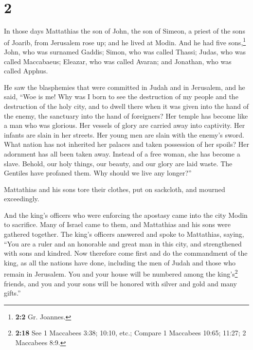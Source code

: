 \hypertarget{section-1}{%
\section{2}\label{section-1}}

 In those days Mattathias the son of John, the son of
Simeon, a priest of the sons of Joarib, from Jerusalem rose up; and he
lived at Modin.  And he had five sons,\footnote{\textbf{2:2}
  Gr. Joannes.} John, who was surnamed Gaddis;  Simon, who
was called Thassi;  Judas, who was called Maccabaeus;
 Eleazar, who was called Avaran; and Jonathan, who was
called Apphus.

 He saw the blasphemies that were committed in Judah and
in Jerusalem,  and he said, ``Woe is me! Why was I born to
see the destruction of my people and the destruction of the holy city,
and to dwell there when it was given into the hand of the enemy, the
sanctuary into the hand of foreigners?  Her temple has
become like a man who was glorious.  Her vessels of glory
are carried away into captivity. Her infants are slain in her streets.
Her young men are slain with the enemy's sword.  What
nation has not inherited her palaces and taken possession of her spoils?
 Her adornment has all been taken away. Instead of a free
woman, she has become a slave.  Behold, our holy things,
our beauty, and our glory are laid waste. The Gentiles have profaned
them.  Why should we live any longer?''

 Mattathias and his sons tore their clothes, put on
sackcloth, and mourned exceedingly.

 And the king's officers who were enforcing the apostasy
came into the city Modin to sacrifice.  Many of Israel
came to them, and Mattathias and his sons were gathered together.
 The king's officers answered and spoke to Mattathias,
saying, ``You are a ruler and an honorable and great man in this city,
and strengthened with sons and kindred.  Now therefore
come first and do the commandment of the king, as all the nations have
done, including the men of Judah and those who remain in Jerusalem. You
and your house will be numbered among the king's\footnote{\textbf{2:18}
  See 1 Maccabees 3:38; 10:10, etc.; Compare 1 Maccabees 10:65; 11:27; 2
  Maccabees 8:9.} friends, and you and your sons will be honored with
silver and gold and many gifts.''

